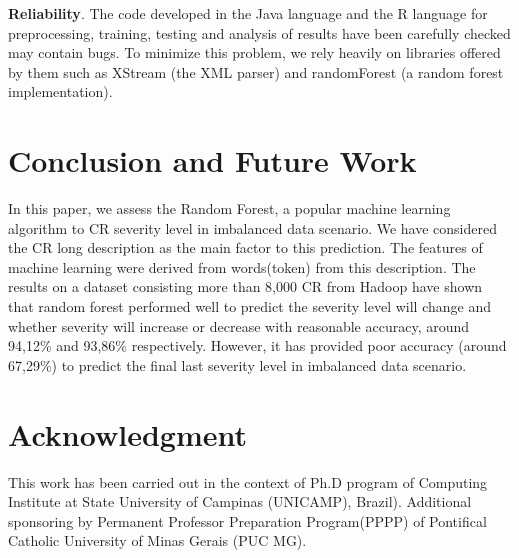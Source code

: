 \documentclass[10pt, conference]{IEEEtran}
\begin{document}
\textbf{Reliability}. The code developed in the Java language and the R language for preprocessing, training, testing and analysis of results have been carefully checked may contain bugs. To minimize this problem, we rely heavily on libraries offered by them such as XStream (the XML parser) and randomForest (a random forest implementation). 

\section{Conclusion and Future Work}
In this paper, we assess the Random Forest, a popular machine learning algorithm to CR severity level in imbalanced data scenario. We have considered the CR long description as the main factor to
this prediction. The features of machine learning were derived from
words(token) from this description. The results on a dataset consisting more than
8,000 CR from Hadoop have shown that random forest performed well to predict the severity level will change and whether severity will increase or decrease with reasonable accuracy, around 94,12\% and 93,86\% respectively. However, it has provided poor accuracy (around 67,29\%) to predict the final last severity level in imbalanced data scenario.

\section*{Acknowledgment}
This work has been carried out in the context of Ph.D program of  Computing Institute at State University of Campinas (UNICAMP), Brazil). Additional sponsoring by Permanent Professor Preparation Program(PPPP) of Pontifical Catholic University of Minas Gerais (PUC MG). 






%
%





\end{document}
